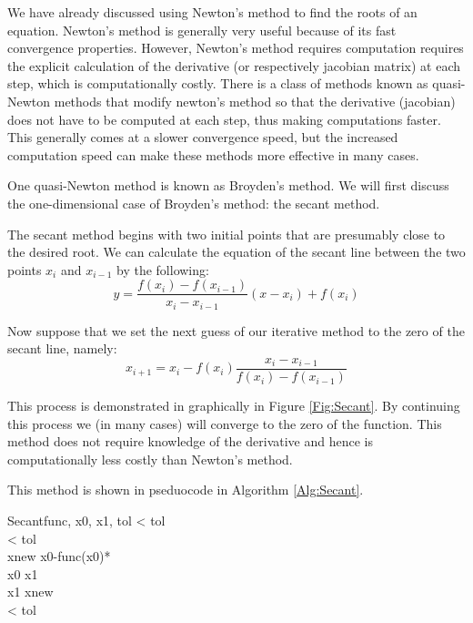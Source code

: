 

We have already discussed using Newton's method to find the roots of an equation. Newton's method is generally very useful because of its fast convergence properties. However, Newton's method requires computation requires the explicit calculation of the derivative (or respectively jacobian matrix) at each step, which is computationally costly. There is a class of methods known as quasi-Newton methods that modify newton's method so that the derivative (jacobian) does not have to be computed at each step, thus making computations faster. This generally comes at a slower convergence speed, but the increased computation speed can make these methods more effective in many cases.

One quasi-Newton method is known as Broyden's method. We will first discuss the one-dimensional case of Broyden's method: the secant method.

The secant method begins with two initial points that are presumably close to the desired root. We can calculate the equation of the secant line between the two points $x_i$ and $x_{i-1}$ by the following:
\[
y = \frac{f(x_i)-f(x_{i-1})}{x_i-x_{i-1}}(x-x_i) + f(x_i)
\]

Now suppose that we set the next guess of our iterative method to the zero of the secant line, namely:
\[
x_{i+1} = x_i - f(x_i)\frac{x_i-x_{i-1}}{f(x_i)-f(x_{i-1})}
\]

This process is demonstrated in graphically in Figure \ref{Fig:Secant}.  By continuing this process we (in many cases) will converge to the zero of the function. This method does not require knowledge of the derivative and hence is computationally less costly than Newton's method.

This method is shown in pseduocode in Algorithm \ref{Alg:Secant}.

\begin{pseudo}{Secant}{func, x0, x1, tol}
\label{Alg:Secant}
\IF {} < tol \THEN
    \\
\IF {} < tol \THEN
    \\

\REPEAT 
xnew \GETS x0-func(x0)*\\
x0 \GETS x1 \\
x1 \GETS xnew \\
\UNTIL {} < tol \THEN {}
\end{pseudo}


